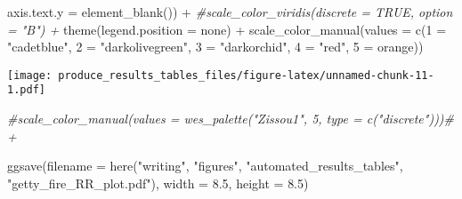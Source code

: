 \documentclass[
]{article}
\newenvironment{Shaded}{\begin{snugshade}}{\end{snugshade}}
\newcommand{\AttributeTok}[1]{\textcolor[rgb]{0.77,0.63,0.00}{#1}}
\newcommand{\CommentTok}[1]{\textcolor[rgb]{0.56,0.35,0.01}{\textit{#1}}}
\newcommand{\FloatTok}[1]{\textcolor[rgb]{0.00,0.00,0.81}{#1}}
\newcommand{\FunctionTok}[1]{\textcolor[rgb]{0.00,0.00,0.00}{#1}}
\newcommand{\NormalTok}[1]{#1}
\newcommand{\OtherTok}[1]{\textcolor[rgb]{0.56,0.35,0.01}{#1}}
\newcommand{\SpecialCharTok}[1]{\textcolor[rgb]{0.00,0.00,0.00}{#1}}
\newcommand{\StringTok}[1]{\textcolor[rgb]{0.31,0.60,0.02}{#1}}
\begin{document}
\begin{Shaded}
\begin{Highlighting}[]
        \AttributeTok{axis.text.y =} \FunctionTok{element\_blank}\NormalTok{()) }\SpecialCharTok{+}
  \CommentTok{\#scale\_color\_viridis(discrete = TRUE, option = "B") +}
  \FunctionTok{theme}\NormalTok{(}\AttributeTok{legend.position =} \StringTok{\textquotesingle{}none\textquotesingle{}}\NormalTok{) }\SpecialCharTok{+}
  \FunctionTok{scale\_color\_manual}\NormalTok{(}\AttributeTok{values =} \FunctionTok{c}\NormalTok{(}\StringTok{\textasciigrave{}}\AttributeTok{1}\StringTok{\textasciigrave{}} \OtherTok{=} \StringTok{"cadetblue"}\NormalTok{,}
                                \StringTok{\textasciigrave{}}\AttributeTok{2}\StringTok{\textasciigrave{}} \OtherTok{=} \StringTok{"darkolivegreen"}\NormalTok{,}
                                \StringTok{\textasciigrave{}}\AttributeTok{3}\StringTok{\textasciigrave{}} \OtherTok{=} \StringTok{"darkorchid"}\NormalTok{,}
                                \StringTok{\textasciigrave{}}\AttributeTok{4}\StringTok{\textasciigrave{}} \OtherTok{=} \StringTok{"red"}\NormalTok{,}
                                \StringTok{\textasciigrave{}}\AttributeTok{5}\StringTok{\textasciigrave{}} \OtherTok{=} \StringTok{\textquotesingle{}orange\textquotesingle{}}\NormalTok{)) }
\end{Highlighting}
\end{Shaded}

\texttt{[image: produce\_results\_tables\_files/figure-latex/unnamed-chunk-11-1.pdf]}

\begin{Shaded}
\begin{Highlighting}[]
  \CommentTok{\#scale\_color\_manual(values = wes\_palette("Zissou1", 5, type = c("discrete")))\# + }
  
\FunctionTok{ggsave}\NormalTok{(}\AttributeTok{filename =} \FunctionTok{here}\NormalTok{(}\StringTok{"writing"}\NormalTok{, }\StringTok{"figures"}\NormalTok{, }\StringTok{"automated\_results\_tables"}\NormalTok{, }\StringTok{"getty\_fire\_RR\_plot.pdf"}\NormalTok{), }\AttributeTok{width =} \FloatTok{8.5}\NormalTok{, }\AttributeTok{height =} \FloatTok{8.5}\NormalTok{) }
\end{Highlighting}
\end{Shaded}
\end{document}
